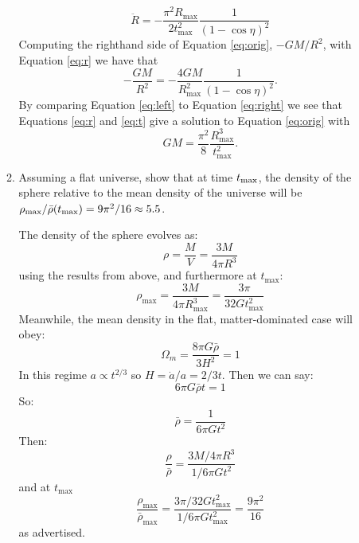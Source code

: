 \begin{enumerate}
\begin{enumerate}
\begin{answer}
\begin{equation}
  \ddot R=-\frac{\pi^2 R_\text{max}}{2t_\text{max}^2}\frac{1}{(1-\cos\eta)^2}\label{eq:left}
\end{equation}
Computing the righthand side of Equation \ref{eq:orig}, $-GM/R^2$, with Equation \ref{eq:r} we have that
\begin{equation}
  -\frac{GM}{R^2}=-\frac{4GM}{R_\text{max}^2}\frac{1}{(1-\cos\eta)^2}\label{eq:right}.
\end{equation}
By comparing Equation \ref{eq:left} to Equation \ref{eq:right} we see
that Equations \ref{eq:r} and \ref{eq:t} give a solution to
Equation \ref{eq:orig} with
\begin{equation}
 \label{eq:GM}
  GM=\frac{\pi^2}{8}\frac{R_\text{max}^3}{t_\text{max}^2}.
\end{equation}
\end{answer}

\item Assuming a flat universe, show that at time $t_{\rm max}$, the density of the sphere
relative to the mean density of the universe will be $\rho_{\rm max}
/ \bar\rho(t_{\rm max}) = 9 \pi^2 / 16 \approx 5.5$.

\begin{answer}
The density of the sphere evolves as:
\begin{equation}
\rho = \frac{M}{V} = \frac{3M}{4\pi R^3}
\end{equation}
using the results from above, and furthermore at $t_\text{max}$:
\begin{equation}
\rho_\text{max} = \frac{3M}{4\pi R_\text{max}^3} = \frac{3\pi}{32 G
t_\text{max}^2}
\end{equation}
Meanwhile, the mean density in the flat, matter-dominated case will obey:
\begin{equation}
\Omega_m = \frac{8\pi G \bar\rho}{3H^2} = 1
\end{equation}
In this regime $a\propto t^{2/3}$ so $H=\dot a / a= 2 / 3t$. Then we
can say:
\begin{equation}
6\pi G \bar\rho t = 1
\end{equation}
So:
\begin{equation}
\bar\rho
= \frac{1}{6\pi G t^2}
\end{equation}
Then:
\begin{equation}
\label{eq:rhoorhobar}
\frac{\rho}{\bar\rho} = \frac{3M / 4\pi R^3}{1 / 6\pi G t^2}
\end{equation}
and at $t_\text{max}$
\begin{equation}
\frac{\rho_\text{max}}{\bar\rho_\text{max}} = \frac{3\pi / 32 G
t_\text{max}^2}{1 / 6 \pi G t_\text{max}^2} = \frac{9\pi^2}{16}
\end{equation}
as advertised.
\end{answer}


\end{enumerate}
\end{enumerate}
